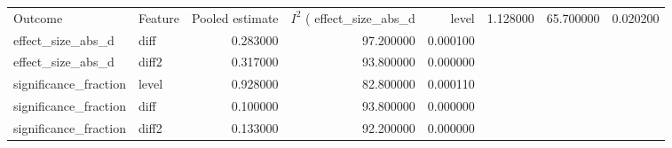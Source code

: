 \begin{tabular}{llrrr}
\toprule
Outcome & Feature & Pooled estimate & $I^2$ (%
\midrule
effect_size_abs_d & level & 1.128000 & 65.700000 & 0.020200 \\
effect_size_abs_d & diff & 0.283000 & 97.200000 & 0.000100 \\
effect_size_abs_d & diff2 & 0.317000 & 93.800000 & 0.000000 \\
significance_fraction & level & 0.928000 & 82.800000 & 0.000110 \\
significance_fraction & diff & 0.100000 & 93.800000 & 0.000000 \\
significance_fraction & diff2 & 0.133000 & 92.200000 & 0.000000 \\
\bottomrule
\end{tabular}
